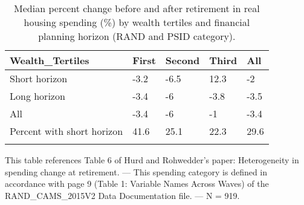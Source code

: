 \begin{table}[tbp] \centering
{}

\caption{Median percent change before and after retirement in real housing spending (\%) by wealth tertiles and financial planning horizon (RAND and PSID category).}
\begin{tabularx}{\textwidth}{lCCCC}

\toprule
{Wealth\_Tertiles}&{First}&{Second}&{Third}&{All} \tabularnewline
\midrule\addlinespace[1.5ex]
Short horizon&-3.2&-6.5&12.3&-2 \tabularnewline
Long horizon&-3.4&-6&-3.8&-3.5 \tabularnewline
All&-3.4&-6&-1&-3.4 \tabularnewline
Percent with short horizon&41.6&25.1&22.3&29.6 \tabularnewline
\bottomrule \addlinespace[1.5ex]

\end{tabularx}
\begin{flushleft}
\footnotesize This table references Table 6 of Hurd and Rohwedder's paper: Heterogeneity in spending change at retirement. \linebreak --- \linebreak This spending category is defined in accordance with page 9 (Table 1: Variable Names Across Waves) of the RAND\_CAMS\_2015V2 Data Documentation file. \linebreak --- \linebreak N = 919.
\end{flushleft}
\end{table}
